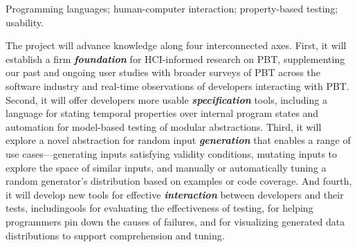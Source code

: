 \smallskip

 Programming languages; human-computer
interaction; property-based testing; usability.

The project will advance knowledge along four interconnected axes.
%
First, it will establish a firm {\bf\em foundation} for HCI-informed
research on PBT, supplementing our past and ongoing user studies with
broader surveys of PBT across the software industry and real-time
observations of developers interacting with PBT.
%
Second, it will offer developers more usable {\bf\em specification} tools,
including a language for stating temporal properties over internal
program states and automation for model-based testing of
modular abstractions.
%
Third, it will explore a novel abstraction for random input {\bf\em
  generation} that enables a range of use cases---generating inputs
satisfying validity conditions, mutating inputs to explore the space
of similar inputs, and manually or automatically tuning a random
generator's distribution based on examples or code coverage.
%
And fourth, it will develop new tools for effective {\bf\em
  interaction} between developers and their tests, includingools for
evaluating the effectiveness of testing, for helping programmers pin
down the causes of failures, and for visualizing generated data
distributions to support comprehension and tuning.


